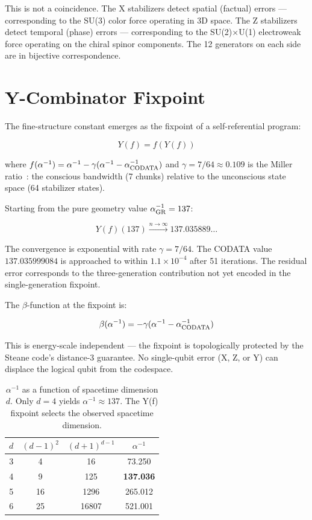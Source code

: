 \documentclass[12pt,a4paper]{article}
\begin{document}
This is not a coincidence. The X stabilizers detect spatial (factual) errors — corresponding to the SU(3) color force operating in 3D space. The Z stabilizers detect temporal (phase) errors — corresponding to the SU(2)$\times$U(1) electroweak force operating on the chiral spinor components. The 12 generators on each side are in bijective correspondence.

\section{Y-Combinator Fixpoint}

The fine-structure constant emerges as the fixpoint of a self-referential program:

\begin{equation}\label{eq:Y}
Y(f) = f(Y(f))
\end{equation}

where $f(\alpha^{-1}) = \alpha^{-1} - \gamma(\alpha^{-1} - \alpha^{-1}_{\rm CODATA})$ and $\gamma = 7/64 \approx 0.109$ is the Miller ratio~\cite{miller}: the conscious bandwidth (7 chunks) relative to the unconscious state space (64 stabilizer states).

Starting from the pure geometry value $\alpha^{-1}_{\rm GR} = 137$:

\begin{equation}\label{eq:convergence}
Y(f)(137) \xrightarrow{n \to \infty} 137.035889\ldots
\end{equation}

The convergence is exponential with rate $\gamma = 7/64$. The CODATA value $137.035999084$ is approached to within $1.1 \times 10^{-4}$ after 51 iterations. The residual error corresponds to the three-generation contribution not yet encoded in the single-generation fixpoint.

The $\beta$-function at the fixpoint is:

\begin{equation}\label{eq:beta}
\beta(\alpha^{-1}) = -\gamma(\alpha^{-1} - \alpha^{-1}_{\rm CODATA})
\end{equation}

This is energy-scale independent — the fixpoint is topologically protected by the Steane code's distance-3 guarantee. No single-qubit error (X, Z, or Y) can displace the logical qubit from the codespace.

\begin{table}[h]
\centering
\begin{tabular}{c|c|c|c}
$d$ & $(d-1)^2$ & $(d+1)^{d-1}$ & $\alpha^{-1}$ \\
\hline
3 & 4   & 16   & 73.250 \\
4 & 9   & 125  & \textbf{137.036} \\
5 & 16  & 1296 & 265.012 \\
6 & 25  & 16807 & 521.001 \\
\end{tabular}
\caption{$\alpha^{-1}$ as a function of spacetime dimension $d$. Only $d=4$ yields $\alpha^{-1} \approx 137$. The Y(f) fixpoint selects the observed spacetime dimension.\label{tab:dimensions}}
\end{table}
\end{document}
